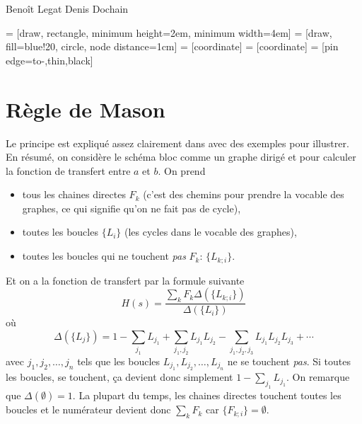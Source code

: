 

\usepackage{graphicx}
\usepackage{caption}
\usepackage{subcaption}

\newcommand{\sbt}{\,\begin{picture}(-1,1)(-1,-3)\circle*{2.5}\end{picture}\ }
\newcommand{\umin}{u_\mathrm{min}}
\newcommand{\umax}{u_\mathrm{max}}

\usepackage{tikz}
\usepackage{pgfplots}
\usetikzlibrary{arrows,calc}

{Benoît Legat}
{Denis Dochain}

 = [draw, rectangle, minimum height=2em, minimum width=4em]
 = [draw, fill=blue!20, circle, node distance=1cm]
 = [coordinate]  = [coordinate]
 = [pin edge={to-,thin,black}]



\section{Règle de Mason}
Le principe est expliqué assez clairement dans \cite{chau2002mason}
avec des exemples pour illustrer.
En résumé, on considère le schéma bloc comme un graphe dirigé et
pour calculer la fonction de transfert entre $a$ et $b$.
On prend
\begin{itemize}
  \item tous les chaines directes $F_k$ (c'est des chemins pour prendre la vocable des graphes, ce qui signifie qu'on ne fait pas de cycle),
  \item toutes les boucles $\{L_i\}$ (les cycles dans le vocable des graphes),
  \item toutes les boucles qui ne touchent \emph{pas} $F_k$: $\{L_{k;i}\}$.
\end{itemize}
Et on a la fonction de transfert par la formule suivante
\[ H(s) = \frac{\sum_k F_k\Delta(\{L_{k;i}\})}{\Delta(\{L_i\})} \]
où
\[ \Delta(\{L_j\}) = 1 - \sum_{j_1} L_{j_1} + \sum_{j_1,j_2} L_{j_1}L_{j_2} - \sum_{j_1,j_2,j_3} L_{j_1}L_{j_2}L_{j_3} + \cdots \]
avec $j_1, j_2, \ldots, j_n$ tels que les boucles $L_{j_1}, L_{j_2}, \ldots, L_{j_n}$ ne se touchent \emph{pas}.
Si toutes les boucles, se touchent, ça devient donc simplement
\( 1 - \sum_{j_1} L_{j_1}. \)
On remarque que $\Delta(\emptyset) = 1$.
La plupart du temps, les chaines directes touchent toutes les boucles et le numérateur devient donc $\sum_k F_k$ car $\{F_{k;i}\} = \emptyset$.

